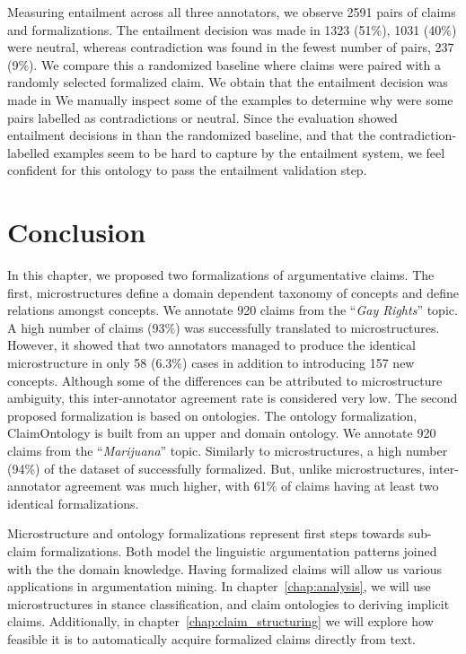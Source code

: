 Measuring entailment across all three annotators, we observe 2591 pairs of claims
and formalizations. The entailment decision was made in 1323 (51\%), 1031 (40\%)
were neutral, whereas contradiction was found in the fewest number of pairs, 
237 (9\%). We compare this a randomized baseline where claims were 
paired with a randomly selected formalized claim. 
We obtain that the entailment decision was made in 
We manually inspect some of the examples to determine why were some 
pairs labelled as contradictions or neutral. 
Since the evaluation showed entailment decisions in 
than the randomized baseline, and that the contradiction-labelled examples 
seem to be hard to capture by the entailment system, we feel confident for this ontology
to pass the entailment validation step. 

\section{Conclusion}
\label{sec:formalization_conclusion}

In this chapter, we proposed two formalizations of argumentative claims.  The
first, microstructures define a domain dependent taxonomy of concepts and
define relations amongst concepts. We annotate 920 claims from the ``\emph{Gay
Rights}'' topic. A high number of claims (93\%) was successfully translated to
microstructures.  However, it showed that two annotators managed to produce the
identical microstructure in only 58 (6.3\%) cases in addition to introducing
157 new concepts. Although some of the differences can be attributed to
microstructure ambiguity, this inter-annotator agreement rate is considered
very low. 
The second proposed formalization is based on ontologies. 
The ontology formalization, ClaimOntology is built from an upper and 
domain ontology. We annotate 920 claims from the ``\emph{Marijuana}''
topic. Similarly to microstructures, a high number (94\%) of the dataset of
successfully formalized.
But, unlike microstructures, inter-annotator agreement was much higher, with 
61\% of claims having at least two identical formalizations. 

Microstructure and ontology formalizations represent first steps
towards sub-claim formalizations. 
Both model the linguistic argumentation patterns
joined with the the domain knowledge. 
Having formalized claims will allow us various applications in 
argumentation mining. In chapter~\ref{chap:analysis}, we will use
microstructures in stance classification, and 
claim ontologies to deriving implicit claims. 
Additionally, in chapter~\ref{chap:claim_structuring} we will explore
how feasible it is to automatically acquire formalized
claims directly from text.  

